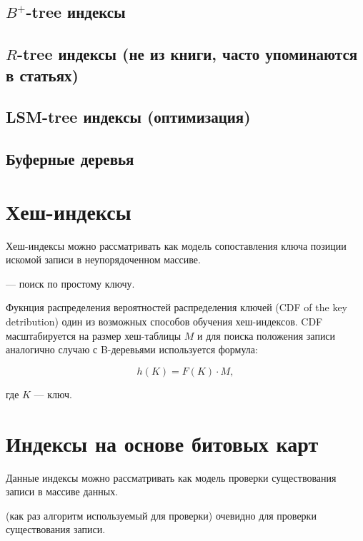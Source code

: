 \subsection{$B^+$-tree индексы}

\subsection{$R$-tree индексы (не из книги, часто упоминаются в статьях)}

\subsection{LSM-tree индексы (оптимизация)}

\subsection{Буферные деревья}


\section{Хеш-индексы}

Хеш-индексы можно рассматривать как модель сопоставления ключа позиции
искомой записи в неупорядоченном массиве.

 --- поиск по простому ключу.

Фукнция распределения вероятностей распределения ключей (CDF of the key
detribution) один из возможных способов обучения хеш-индексов. CDF
масштабируется на размер хеш-таблицы $M$ и для поиска положения записи
аналогично случаю с B-деревьями используется формула:

\begin{equation}
    h(K) = F(K) \cdot M,
\end{equation}

где $K$ --- ключ.

\section{Индексы на основе битовых карт}

Данные индексы можно рассматривать как модель проверки существования записи в
массиве данных.

 (как раз алгоритм используемый для проверки) очевидно
 для проверки существования записи.

